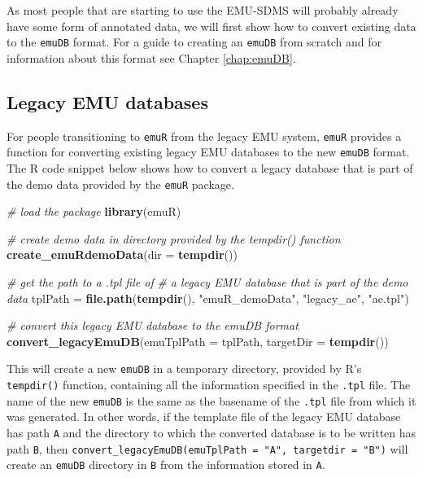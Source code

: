 \documentclass[]{book}
\newenvironment{Shaded}{\begin{snugshade}}{\end{snugshade}}
\newcommand{\CommentTok}[1]{\textcolor[rgb]{0.56,0.35,0.01}{\textit{#1}}}
\newcommand{\DataTypeTok}[1]{\textcolor[rgb]{0.13,0.29,0.53}{#1}}
\newcommand{\KeywordTok}[1]{\textcolor[rgb]{0.13,0.29,0.53}{\textbf{#1}}}
\newcommand{\NormalTok}[1]{#1}
\newcommand{\StringTok}[1]{\textcolor[rgb]{0.31,0.60,0.02}{#1}}
\theoremstyle{definition}
\theoremstyle{definition}
\theoremstyle{definition}
\theoremstyle{remark}
\begin{document}
As most people that are starting to use the EMU-SDMS will probably
already have some form of annotated data, we will first show how to
convert existing data to the \texttt{emuDB} format. For a guide to
creating an \texttt{emuDB} from scratch and for information about this
format see Chapter \ref{chap:emuDB}.

\hypertarget{legacy-emu-databases}{%
\subsection{Legacy EMU databases}\label{legacy-emu-databases}}

For people transitioning to \texttt{emuR} from the legacy EMU system,
\texttt{emuR} provides a function for converting existing legacy EMU
databases to the new \texttt{emuDB} format. The R code snippet below
shows how to convert a legacy database that is part of the demo data
provided by the \texttt{emuR} package.

\begin{Shaded}
\begin{Highlighting}[]
\CommentTok{# load the package}
\KeywordTok{library}\NormalTok{(emuR)}

\CommentTok{# create demo data in directory provided by the tempdir() function}
\KeywordTok{create_emuRdemoData}\NormalTok{(}\DataTypeTok{dir =} \KeywordTok{tempdir}\NormalTok{())}

\CommentTok{# get the path to a .tpl file of}
\CommentTok{# a legacy EMU database that is part of the demo data}
\NormalTok{tplPath =}\StringTok{ }\KeywordTok{file.path}\NormalTok{(}\KeywordTok{tempdir}\NormalTok{(),}
                    \StringTok{"emuR_demoData"}\NormalTok{,}
                    \StringTok{"legacy_ae"}\NormalTok{,}
                    \StringTok{"ae.tpl"}\NormalTok{)}

\CommentTok{# convert this legacy EMU database to the emuDB format}
\KeywordTok{convert_legacyEmuDB}\NormalTok{(}\DataTypeTok{emuTplPath =}\NormalTok{ tplPath, }\DataTypeTok{targetDir =} \KeywordTok{tempdir}\NormalTok{())}
\end{Highlighting}
\end{Shaded}

This will create a new \texttt{emuDB} in a temporary directory, provided
by R's \texttt{tempdir()} function, containing all the information
specified in the \texttt{.tpl} file. The name of the new \texttt{emuDB}
is the same as the basename of the \texttt{.tpl} file from which it was
generated. In other words, if the template file of the legacy EMU
database has path \texttt{A} and the directory to which the converted
database is to be written has path \texttt{B}, then
\texttt{convert\_legacyEmuDB(emuTplPath\ =\ "A",\ targetdir\ =\ "B")}
will create an \texttt{emuDB} directory in \texttt{B} from the
information stored in \texttt{A}.
\end{document}
